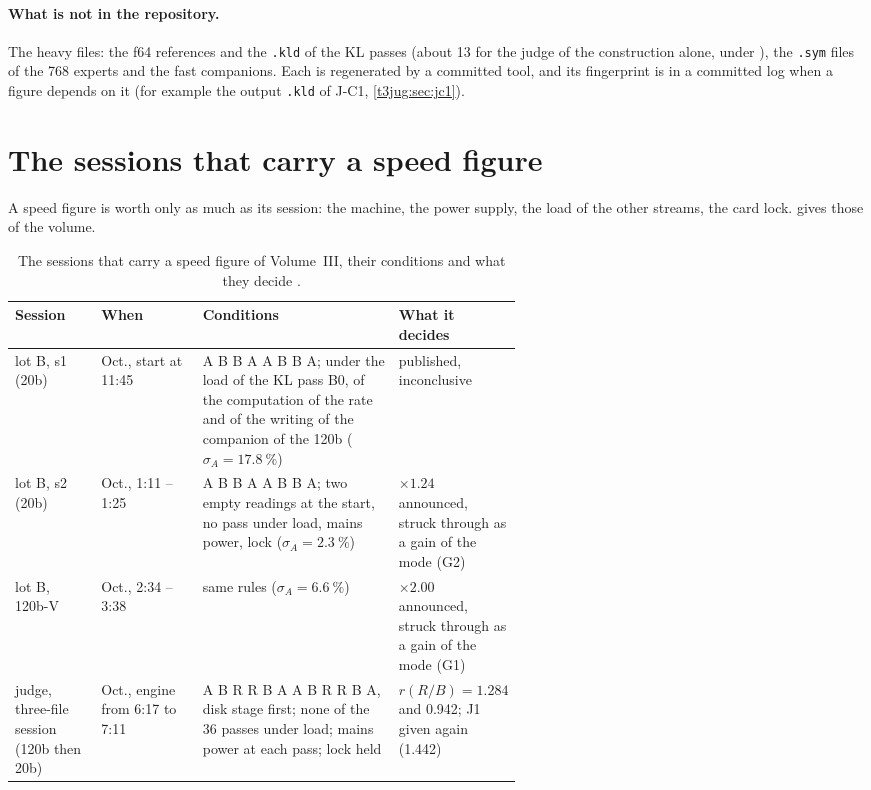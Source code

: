 \paragraph{What is not in the repository.} The heavy files: the f64 references and the \texttt{.kld} of the KL passes (about \SI{13}{\Go} for the judge of the construction alone, under ), the \texttt{.sym} files of the 768 experts and the fast companions. Each is regenerated by a committed tool, and its fingerprint is in a committed log when a figure depends on it (for example the output \texttt{.kld} of J-C1, \cref{t3jug:sec:jc1}).

\section{The sessions that carry a speed figure}\label{t3ann:sec:seances}

A speed figure is worth only as much as its session: the machine, the power supply, the load of the other streams, the card lock.  gives those of the volume.

\begin{table}[ht]
\centering\footnotesize
\caption[The speed sessions of Volume~III]{The sessions that carry a speed figure of Volume~III, their conditions and what they decide \mes.}
\label{t3ann:tab:seances}
\begin{tabularx}{\linewidth}{@{}>{\raggedright\arraybackslash}p{0.17\linewidth}>{\raggedright\arraybackslash}p{0.20\linewidth}>{\raggedright\arraybackslash}X>{\raggedright\arraybackslash}p{0.22\linewidth}@{}}
\toprule
Session & When & Conditions & What it decides \\
\midrule
lot B, s1 (20b) & 17 Oct., start at 11:45 & A B B A A B B A; under the load of the KL pass B0, of the computation of the rate and of the writing of the companion of the 120b ($\sigma_A = \SI{17.8}{\percent}$) & published, inconclusive \\
lot B, s2 (20b) & 22 Oct., 1:11 -- 1:25 & A B B A A B B A; two empty readings at the start, no pass under load, mains power, lock ($\sigma_A = \SI{2.3}{\percent}$) & $\times 1.24$ announced, struck through as a gain of the mode (G2) \\
lot B, 120b-V & 22 Oct., 2:34 -- 3:38 & same rules ($\sigma_A = \SI{6.6}{\percent}$) & $\times 2.00$ announced, struck through as a gain of the mode (G1) \\
judge, three-file session (120b then 20b) & 22 Oct., engine from 6:17 to 7:11 & A B R R B A A B R R B A, disk stage first; none of the 36 passes under load; mains power at each pass; lock held & $r(R/B) = \num{1.284}$ and \num{0.942}; J1 given again (\num{1.442}) \\
\bottomrule
\end{tabularx}
\end{table}

